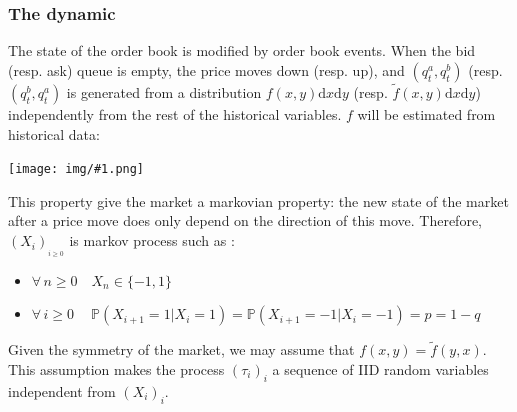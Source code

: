 \documentclass{article}
\newcommand{\IMGC}[1] {
\begin{center} \texttt{[image: img/\#1.png]} \end{center}
 }
\begin{document}
\subsubsection{The dynamic}

The state  of the order book is modified by order book events. When the bid (resp. ask) queue is empty, the price moves down (resp. up), and $(q_t^a, q_t^b)$ (resp.$ (q_t^b, q_t^a)$ is generated from a distribution $f(x, y) \mathrm{d}x \mathrm{d}y $ (resp. $\tilde f(x, y) \mathrm{d}x \mathrm{d}y $) independently from the rest of the historical variables.
$f$ will be estimated from historical data:

\IMGC{hist_f}

This property give the market a markovian property: the new state of the market after a price move does only depend on the direction of this move.
Therefore,  $(X_i)_{_{i \geq 0}}$ is markov process such as :
\begin{itemize}
\item $\forall \, n\geq0 \quad X_{n} \in \{-1,1\} $ 
\item $\forall \, i\geq0 \quad\ \mathbb{P}( X_{i+1}=1 | X_i=1 ) = \mathbb{P}( X_{i+1}=-1 | X_i=-1 ) = p = 1-q$
\end{itemize}
Given the symmetry of the market, we may assume that $f(x, y) = \tilde f(y, x)$. This assumption makes the process $(\tau_i)_i$ a sequence of IID random variables independent from $(X_i)_i$.
\end{document}
